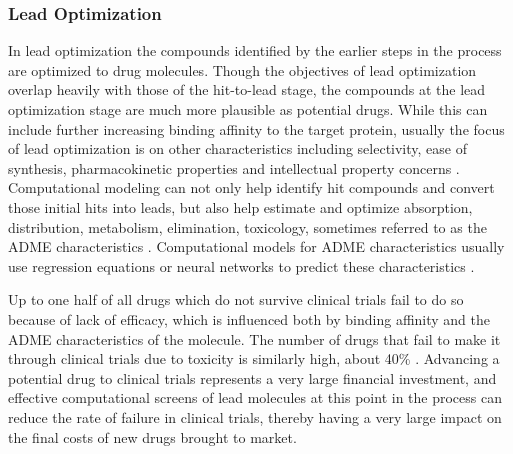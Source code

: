 \subsubsection{Lead Optimization}
\label{subsubsection:lead_optimization}
In lead optimization the compounds identified by the earlier steps in the process are optimized to drug molecules.
Though the objectives of lead optimization overlap heavily with those of the hit-to-lead stage, the compounds at the lead optimization stage are much more plausible as potential drugs.
While this can include further increasing binding affinity to the target protein, usually the focus of lead optimization is on other characteristics including selectivity, ease of synthesis, pharmacokinetic properties and intellectual property concerns \cite{keserHu2006hit}.
Computational modeling can not only help identify hit compounds and convert those initial hits into leads, but also help estimate and optimize absorption, distribution, metabolism, elimination, toxicology, sometimes referred to as the ADME characteristics \cite{kerns2008drug}.
Computational models for ADME characteristics usually use regression equations or neural networks to predict these characteristics \cite{jorgensen2004many}.

Up to one half of all drugs which do not survive clinical trials fail to do so because of lack of efficacy, which is influenced both by binding affinity and the ADME characteristics of the molecule.
The number of drugs that fail to make it through clinical trials due to toxicity is similarly high, about 40\% \cite{li2001screening}.
Advancing a potential drug to clinical trials represents a very large financial investment, and effective computational screens of lead molecules at this point in the process can reduce the rate of failure in clinical trials, thereby having a very large impact on the final costs of new drugs brought to market.
